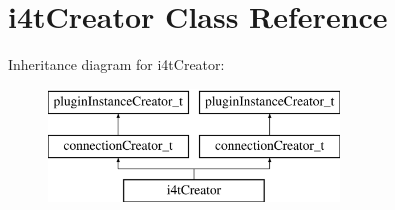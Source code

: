 \hypertarget{classi4tCreator}{\section{i4t\-Creator \-Class \-Reference}
\label{classi4tCreator}
}
\-Inheritance diagram for i4t\-Creator\-:\begin{figure}[H]
\begin{center}
\leavevmode
\includegraphics[height=3.000000cm]{classi4tCreator}
\end{center}
\end{figure}
